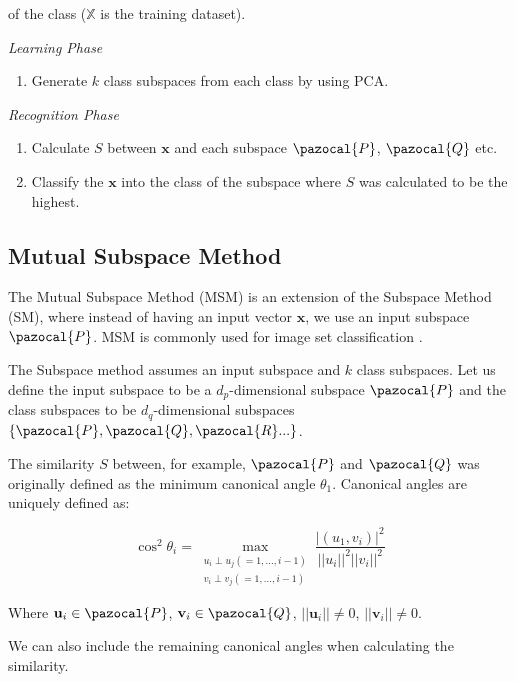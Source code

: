 \noident of the class ($\mathbb{X}$ is the training dataset).

{\setlength{\parindent}{0cm} \vspace{5mm}

\emph{Learning Phase}

\begin{enumerate}
    \item Generate $k$ class subspaces from each class by using PCA.
\end{enumerate}

\emph{Recognition Phase}

\begin{enumerate}
    \item Calculate $S$ between $\mathbf{x}$ and each subspace $\pazocal{P}$, $\pazocal{Q}$ etc.
    \item Classify the $\mathbf{x}$ into the class of the subspace where $S$ was calculated to be the highest.
\end{enumerate}
}
\newpage

\subsection{Mutual Subspace Method}

The Mutual Subspace Method (MSM) is an extension of the Subspace Method (SM), where instead of having an input vector $\mathbf{x}$, we use an input subspace $\pazocal{P}$. MSM is commonly used for image set classification \cite{sakai2019gait}.

The Subspace method assumes an input subspace and $k$ class subspaces. Let us define the input subspace to be a $d_p$-dimensional subspace $\pazocal{P}$ and the class subspaces to be $d_q$-dimensional subspaces $\{\pazocal{P}, \pazocal{Q}, \pazocal{R}...\}$.

The similarity $S$ between, for example, $\pazocal{P}$ and $\pazocal{Q}$ was originally defined as the minimum canonical angle $\theta_1$. Canonical angles \cite{chatelin2012} are uniquely defined as:

\[    \cos^2 \theta_i = \max_{\substack{u_i \perp u_j(=1,...,i−1) \\ v_i \perp v_j(=1,...,i−1)}} \frac{|(u_1,v_i)|^2}{||u_i||^2||v_i||^2}\]

Where $\mathbf{u}_i \in \pazocal{P}$, $\mathbf{v}_i \in \pazocal{Q}$, $||\mathbf{u}_i|| \neq 0$, $||\mathbf{v}_i|| \neq 0$.

We can also include the remaining canonical angles when calculating the similarity.


